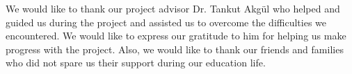 \vspace*{-6pt}
We would like to thank our project advisor Dr. Tankut Akgül who helped and guided us during the project and assisted us to overcome the difficulties we encountered. We would like to express our gratitude to him for helping us make progress with the project. Also, we would like to thank our friends and families who did not spare us their support during our education life.




